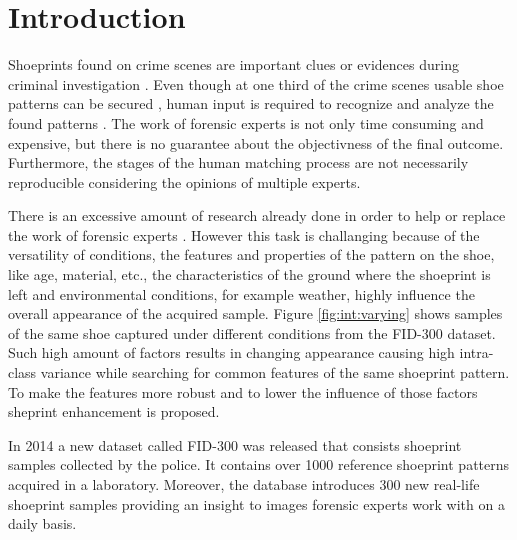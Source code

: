 \documentclass[draft,final]{vutinfth} %
\begin{document}

\tableofcontents %

\mainmatter

\chapter{Introduction}

\par
Shoeprints found on crime scenes are important clues or evidences during criminal investigation \cite{kong2014novel}.
Even though at one third of the crime scenes usable shoe patterns can be secured \cite{alexandre1996computerized}, human input is required to recognize and analyze the found patterns  \cite{wang2014automatic}.
The work of forensic experts is not only time consuming and expensive, but there is no guarantee about the objectivness of the final outcome\cite{gueham2008automatic}.
Furthermore, the stages of the human matching process are not necessarily reproducible considering the opinions of multiple experts.
\par
There is an excessive amount of research already done in order to help or replace the work of forensic experts \cite{rida2019forensic}.
However this task is challanging because of the versatility of conditions, the features and properties of the pattern on the shoe, like age, material, etc., the characteristics of the ground where the shoeprint is left and environmental conditions, for example weather, highly influence the overall appearance of the acquired sample.
Figure \ref{fig:int:varying} shows samples of the same shoe captured under different conditions from the FID-300 \cite{kortylewski2014unsupervised} dataset.
Such high amount of factors results in changing appearance causing high intra-class variance while searching for common features of the same shoeprint pattern.
To make the features more robust and to lower the influence of those factors sheprint enhancement is proposed.
\par
In 2014 a new dataset called FID-300 \cite{kortylewski2014unsupervised} was released that consists shoeprint samples collected by the police. 
It contains over 1000 reference shoeprint patterns acquired in a laboratory.
Moreover, the database introduces 300 new real-life shoeprint samples providing an insight to images forensic experts work with on a daily basis.
\end{document}
